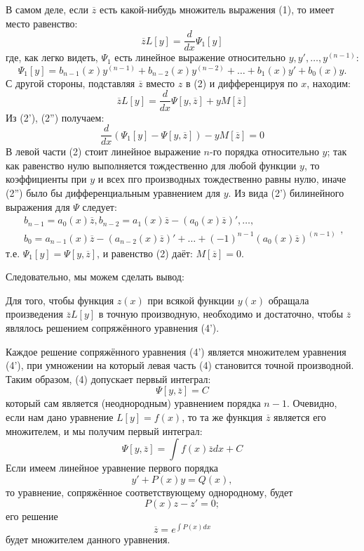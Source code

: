 В самом деле, если $\overline{z}$ есть какой-нибудь множитель выражения (1), то имеет место равенство:
\[
	\overline{z} L[y] = \frac{d}{dx} \Psi_1 [y] \tag{2'}
\]
где, как легко видеть, $\Psi_1$ есть линейное выражение относительно $y, y', \dots, y^{(n-1)}$:
\[
	\Psi_1[y] = b_{n-1}(x) y^{(n-1)} + b_{n-2} (x) y^{(n-2)} + \dots + b_1 (x) y' + b_0 (x) y.
\]
С другой стороны, подставляя $\overline{z}$ вместо $z$ в (2) и дифференцируя по $x$, находим:
\[
	\overline{z} L[y] = \frac{d}{dx} \Psi\left[ y, \overline{z}\right] + y M\left[ \overline{z}\right] \tag{2''}
\]
Из (2'), (2'') получаем:
\[
	\frac{d}{dx} \left( \Psi_1[y] - \Psi\left[ y, \overline{z}\right]\right) - yM\left[ \overline{z}\right]= 0 \tag{2\textquotesingle \textquotesingle \textquotesingle}
\]
В левой части (2\textquotesingle \textquotesingle \textquotesingle) стоит линейное выражение $n$-го порядка относительно $y$; так как равенство нулю выполняется тождественно для любой функции $y$, то коэффициенты при $y$ и всех пго производных тождественно равны нулю, иначе (2'') было бы дифференциальным уравнением для $y$. Из вида (2') билинейного выражения для $\Psi$ следует:
\[
	\begin{aligned}
		b_{n-1} = a_0 (x) \overline{z}, b_{n-2} = a_1 (x) \overline{z} - \left(a_0(x) \overline{z} \right)', \dots, \\
		b_0 = a_{n-1} (x) \overline{z} - \left(a_{n-2} (x) \overline{z}\right)' + \dots + (-1)^{n-1} \left( a_0(x) \overline{z}\right)^{(n-1)}
	\end{aligned},
\]
т.е. $\Psi_1[y] = \Psi \left[ y, \overline{z}\right]$, и равенство (2\textquotesingle \textquotesingle \textquotesingle) даёт: $M\left[ \overline{z}\right]=0$.

Следовательно, мы можем сделать вывод:

Для того, чтобы функция $z(x)$ при всякой функции $y(x)$ обращала произведения $\overline{z}L[y]$ в точную производную, необходимо и достаточно, чтобы $\overline{z}$ являлось решением сопряжённого уравнения (4').

Каждое решение сопряжённого уравнения (4') является множителем уравнения (4'), при умножении на который левая часть (4) становится точной производной. Таким образом, (4) допускает первый интеграл:
\[
	\Psi\left[ y, \overline{z}\right] = C \tag{5}
\]
который сам является (неоднородным) уравнением порядка $n-1$. Очевидно, если нам дано уравнение $L[y]=f(x)$, то та же функция $\overline{z}$ является его множителем, и мы получим первый интеграл:
\[
	\Psi \left[ y, \overline{z}\right] = \int f(x) \overline{z}dx + C
\]
Если имеем линейное уравнение первого порядка
\[
	y'+P(x)y = Q(x),
\]
то уравнение, сопряжённое соответствующему однородному, будет
\[
	P(x)z-z'=0;
\]
его решение
\[
	\overline{z} = e^{\int P(x)dx}	
\]
будет множителем данного уравнения.

